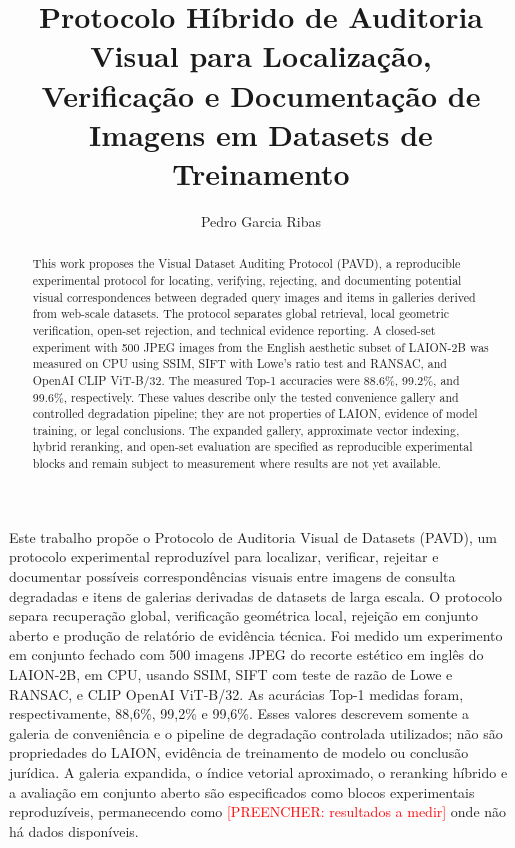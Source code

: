 \documentclass[12pt]{article}
\title{Protocolo Híbrido de Auditoria Visual para Localização, Verificação e Documentação de Imagens em Datasets de Treinamento}
\author{
  Pedro Garcia Ribas\inst{1}
}
\newcommand{\todo}[1]{\textcolor{red}{[PREENCHER: #1]}}
\newcommand{\pavd}{PAVD}
\begin{document}
\maketitle

\begin{abstract}
This work proposes the Visual Dataset Auditing Protocol (\pavd), a reproducible
experimental protocol for locating, verifying, rejecting, and documenting
potential visual correspondences between degraded query images and items in
galleries derived from web-scale datasets. The protocol separates global
retrieval, local geometric verification, open-set rejection, and technical
evidence reporting. A closed-set experiment with 500 JPEG images from the
English aesthetic subset of LAION-2B was measured on CPU using SSIM, SIFT with
Lowe's ratio test and RANSAC, and OpenAI CLIP ViT-B/32. The measured Top-1
accuracies were 88.6\%, 99.2\%, and 99.6\%, respectively. These values describe
only the tested convenience gallery and controlled degradation pipeline; they
are not properties of LAION, evidence of model training, or legal conclusions.
The expanded gallery, approximate vector indexing, hybrid reranking, and
open-set evaluation are specified as reproducible experimental blocks and
remain subject to measurement where results are not yet available.
\end{abstract}

\begin{resumo}
Este trabalho propõe o Protocolo de Auditoria Visual de Datasets (\pavd), um
protocolo experimental reproduzível para localizar, verificar, rejeitar e
documentar possíveis correspondências visuais entre imagens de consulta
degradadas e itens de galerias derivadas de datasets de larga escala. O
protocolo separa recuperação global, verificação geométrica local, rejeição em
conjunto aberto e produção de relatório de evidência técnica. Foi medido um
experimento em conjunto fechado com 500 imagens JPEG do recorte estético em
inglês do LAION-2B, em CPU, usando SSIM, SIFT com teste de razão de Lowe e
RANSAC, e CLIP OpenAI ViT-B/32. As acurácias Top-1 medidas foram,
respectivamente, 88,6\%, 99,2\% e 99,6\%. Esses valores descrevem somente a
galeria de conveniência e o pipeline de degradação controlada utilizados; não
são propriedades do LAION, evidência de treinamento de modelo ou conclusão
jurídica. A galeria expandida, o índice vetorial aproximado, o reranking
híbrido e a avaliação em conjunto aberto são especificados como blocos
experimentais reproduzíveis, permanecendo como \todo{resultados a medir} onde
não há dados disponíveis.
\end{resumo}
\end{document}
